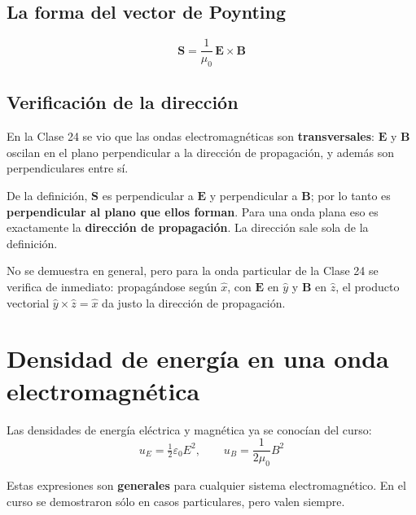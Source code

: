 \documentclass[12pt,a4paper]{article}
\begin{document}
\subsection{La forma del vector de Poynting}

\begin{keybox}
\[
\boxed{\ \mathbf{S} = \frac{1}{\mu_0}\,\mathbf{E}\times\mathbf{B}\ }
\]
\end{keybox}

\subsection{Verificación de la dirección}

En la Clase 24 se vio que las ondas electromagnéticas son \textbf{transversales}:
$\mathbf{E}$ y $\mathbf{B}$ oscilan en el plano perpendicular a la dirección de
propagación, y además son perpendiculares entre sí.

De la definición, $\mathbf{S}$ es perpendicular a $\mathbf{E}$ y perpendicular a
$\mathbf{B}$; por lo tanto es \textbf{perpendicular al plano que ellos forman}.
Para una onda plana eso es exactamente la \textbf{dirección de propagación}. La
dirección sale sola de la definición.

\begin{notebox}
No se demuestra en general, pero para la onda particular de la Clase 24 se
verifica de inmediato: propagándose según $\hat{x}$, con $\mathbf{E}$ en $\hat{y}$
y $\mathbf{B}$ en $\hat{z}$, el producto vectorial
$\hat{y}\times\hat{z} = \hat{x}$ da justo la dirección de propagación.
\end{notebox}

\section{Densidad de energía en una onda electromagnética}

Las densidades de energía eléctrica y magnética ya se conocían del curso:
\[
u_E = \tfrac{1}{2}\varepsilon_0 E^2, \qquad u_B = \frac{1}{2\mu_0}B^2
\]

\begin{notebox}[Validez]
Estas expresiones son \textbf{generales} para cualquier sistema electromagnético.
En el curso se demostraron sólo en casos particulares, pero valen siempre.
\end{notebox}
\end{document}
